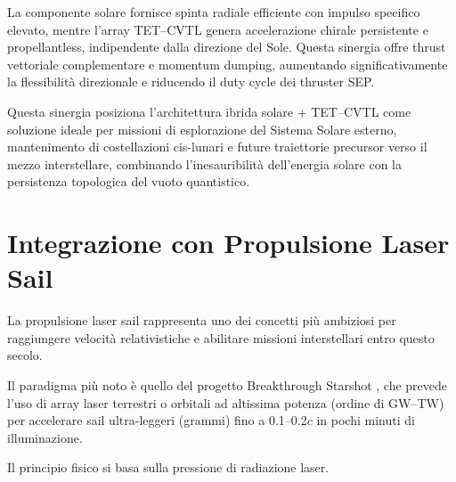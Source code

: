 \documentclass[11pt,a4paper]{article}
\let\oldcite\cite
\renewcommand{\cite}{\protect\oldcite}
\theoremstyle{plain}
\theoremstyle{definition}
\begin{document}
\clearpage


La componente solare fornisce spinta radiale efficiente con impulso specifico elevato, mentre l'array TET--CVTL genera accelerazione chirale persistente e propellantless, indipendente dalla direzione del Sole.
Questa sinergia offre thrust vettoriale complementare e momentum dumping, aumentando significativamente la flessibilità direzionale e riducendo il duty cycle dei thruster SEP.

\vspace{0.2cm}

Questa sinergia posiziona l’architettura ibrida solare + TET--CVTL come soluzione ideale per missioni di esplorazione del Sistema Solare esterno, mantenimento di costellazioni cis-lunari e future traiettorie precursor verso il mezzo interstellare, combinando l’inesauribilità dell’energia solare con la persistenza topologica del vuoto quantistico.









\vspace{0.5cm}











\section{Integrazione con Propulsione Laser Sail}

\vspace{0.2cm}

La propulsione laser sail rappresenta uno dei concetti più ambiziosi per raggiungere velocità relativistiche e abilitare missioni interstellari entro questo secolo. 

\vspace{0.3cm}


Il paradigma più noto è quello del progetto Breakthrough Starshot \cite{breakthrough_starshot_2016, lubin_2016}, che prevede l’uso di array laser terrestri o orbitali ad altissima potenza (ordine di GW–TW) per accelerare sail ultra-leggeri (grammi) fino a 0.1–0.2$c$ in pochi minuti di illuminazione.

\vspace{0.4cm}

Il principio fisico si basa sulla pressione di radiazione laser. 
\end{document}
